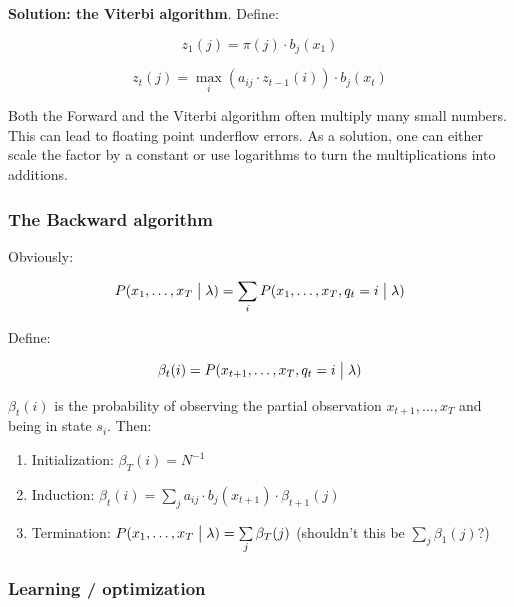 \textbf{Solution: the Viterbi algorithm}. Define:

\begin{equation}
    z_1(j) = \pi(j) \cdot b_j(x_1)
\end{equation}

\begin{equation}
    z_t(j) = \max_i(a_{ij} \cdot z_{t-1}(i)) \cdot b_j(x_t)
\end{equation}

Both the Forward and the Viterbi algorithm often multiply many small numbers. This can lead to floating point underflow errors. As a solution, one can either scale the factor by a constant or use logarithms to turn the multiplications into additions.

\subsubsection{The Backward algorithm}

Obviously:

\begin{equation}
    P(x_1, \ldots, x_T \bigm| \lambda) = \sum\limits_i P(x_1, \ldots, x_T, q_t = i \bigm| \lambda)
\end{equation}

Define:

\begin{equation}
    \beta_t(i) = P(x_{t+1}, \ldots, x_T, q_t = i \bigm| \lambda)
\end{equation}

\vspace{10pt}

$\beta_t(i)$ is the probability of observing the partial observation $x_{t+1}, \ldots, x_T$ and being in state $s_i$. Then:

\begin{enumerate}
    \item Initialization: $\beta_T(i) = N^{-1}$
    \item Induction: $\beta_t(i) = \sum\limits_j a_{ij} \cdot b_j(x_{t+1}) \cdot \beta_{t+1}(j)$
    \item Termination: $P(x_1, \ldots, x_T \bigm| \lambda) = \sum\limits_j \beta_T(j)$ (shouldn't this be $\sum\limits_j \beta_1(j)$?)
\end{enumerate}

\subsubsection{Learning / optimization}

